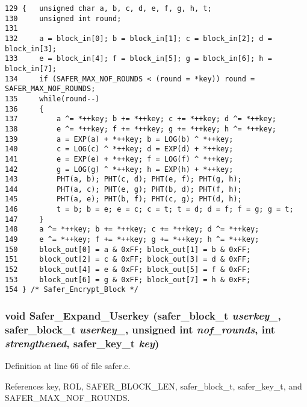 \footnotesize\begin{verbatim}129 {   unsigned char a, b, c, d, e, f, g, h, t;
130     unsigned int round;
131 
132     a = block_in[0]; b = block_in[1]; c = block_in[2]; d = block_in[3];
133     e = block_in[4]; f = block_in[5]; g = block_in[6]; h = block_in[7];
134     if (SAFER_MAX_NOF_ROUNDS < (round = *key)) round = SAFER_MAX_NOF_ROUNDS;
135     while(round--)
136     {
137         a ^= *++key; b += *++key; c += *++key; d ^= *++key;
138         e ^= *++key; f += *++key; g += *++key; h ^= *++key;
139         a = EXP(a) + *++key; b = LOG(b) ^ *++key;
140         c = LOG(c) ^ *++key; d = EXP(d) + *++key;
141         e = EXP(e) + *++key; f = LOG(f) ^ *++key;
142         g = LOG(g) ^ *++key; h = EXP(h) + *++key;
143         PHT(a, b); PHT(c, d); PHT(e, f); PHT(g, h);
144         PHT(a, c); PHT(e, g); PHT(b, d); PHT(f, h);
145         PHT(a, e); PHT(b, f); PHT(c, g); PHT(d, h);
146         t = b; b = e; e = c; c = t; t = d; d = f; f = g; g = t;
147     }
148     a ^= *++key; b += *++key; c += *++key; d ^= *++key;
149     e ^= *++key; f += *++key; g += *++key; h ^= *++key;
150     block_out[0] = a & 0xFF; block_out[1] = b & 0xFF;
151     block_out[2] = c & 0xFF; block_out[3] = d & 0xFF;
152     block_out[4] = e & 0xFF; block_out[5] = f & 0xFF;
153     block_out[6] = g & 0xFF; block_out[7] = h & 0xFF;
154 } /* Safer_Encrypt_Block */
\end{verbatim}\normalsize 
{}
\subsubsection{\setlength{\rightskip}{0pt plus 5cm}void Safer\_\-Expand\_\-Userkey ({\bf safer\_\-block\_\-t} {\em userkey\_}, {\bf safer\_\-block\_\-t} {\em userkey\_}, unsigned int {\em nof\_\-rounds}, int {\em strengthened}, {\bf safer\_\-key\_\-t} {\em key})}\label{safer_8h_a10}




Definition at line 66 of file safer.c.

References key, ROL, SAFER\_\-BLOCK\_\-LEN, safer\_\-block\_\-t, safer\_\-key\_\-t, and SAFER\_\-MAX\_\-NOF\_\-ROUNDS.



